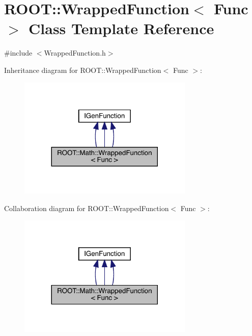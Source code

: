 \hypertarget{classROOT_1_1Math_1_1WrappedFunction}{}\section{R\+O\+OT\+:\+:Wrapped\+Function$<$ Func $>$ Class Template Reference}
\label{classROOT_1_1Math_1_1WrappedFunction}


{\ttfamily \#include $<$Wrapped\+Function.\+h$>$}



Inheritance diagram for R\+O\+OT\+:\+:Wrapped\+Function$<$ Func $>$\+:
\nopagebreak
\begin{figure}[H]
\begin{center}
\leavevmode
\includegraphics[width=236pt]{d3/d1e/classROOT_1_1Math_1_1WrappedFunction__inherit__graph}
\end{center}
\end{figure}


Collaboration diagram for R\+O\+OT\+:\+:Wrapped\+Function$<$ Func $>$\+:
\nopagebreak
\begin{figure}[H]
\begin{center}
\leavevmode
\includegraphics[width=236pt]{d2/d6d/classROOT_1_1Math_1_1WrappedFunction__coll__graph}
\end{center}
\end{figure}
